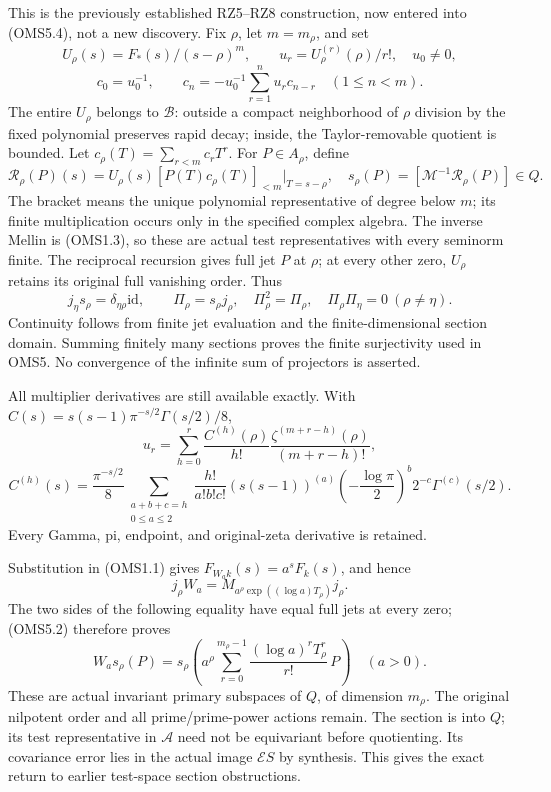 This is the previously established RZ5--RZ8 construction, now entered
into (OMS5.4), not a new discovery. Fix \(\rho\), let \(m=m_\rho\), and
set \[
U_\rho(s)=F_*(s)/(s-\rho)^m,\qquad
u_r=U_\rho^{(r)}(\rho)/r!,\quad u_0\ne0,
\] \[
c_0=u_0^{-1},\qquad
c_n=-u_0^{-1}\sum_{r=1}^n u_r c_{n-r}\quad(1\le n<m).
\tag{OMS6.1}
\] The entire \(U_\rho\) belongs to \(\mathcal B\): outside a compact
neighborhood of \(\rho\) division by the fixed polynomial preserves
rapid decay; inside, the Taylor-removable quotient is bounded. Let
\(c_\rho(T)=\sum_{r<m}c_rT^r\). For \(P\in A_\rho\), define \[
\mathcal R_\rho(P)(s)=U_\rho(s)
[P(T)c_\rho(T)]_{<m}\big|_{T=s-\rho},\quad
s_\rho(P)=[\mathcal M^{-1}\mathcal R_\rho(P)]\in Q.
\tag{OMS6.2}
\] The bracket means the unique polynomial representative of degree
below \(m\); its finite multiplication occurs only in the specified
complex algebra. The inverse Mellin is (OMS1.3), so these are actual
test representatives with every seminorm finite. The reciprocal
recursion gives full jet \(P\) at \(\rho\); at every other zero,
\(U_\rho\) retains its original full vanishing order. Thus \[
j_\eta s_\rho=\delta_{\eta\rho}\mathrm{id},\qquad
\Pi_\rho=s_\rho j_\rho,\quad
\Pi_\rho^2=\Pi_\rho,\quad\Pi_\rho\Pi_\eta=0\ (\rho\ne\eta).
\tag{OMS6.3}
\] Continuity follows from finite jet evaluation and the
finite-dimensional section domain. Summing finitely many sections proves
the finite surjectivity used in OMS5. No convergence of the infinite sum
of projectors is asserted.

All multiplier derivatives are still available exactly. With
\(C(s)=s(s-1)\pi^{-s/2}\Gamma(s/2)/8\), \[
u_r=\sum_{h=0}^r
\frac{C^{(h)}(\rho)}{h!}
\frac{\zeta^{(m+r-h)}(\rho)}{(m+r-h)!},
\] \[
C^{(h)}(s)=\frac{\pi^{-s/2}}8
\sum_{\substack{a+b+c=h\\0\le a\le2}}
\frac{h!}{a!b!c!}(s(s-1))^{(a)}
\left(-\frac{\log\pi}{2}\right)^b2^{-c}\Gamma^{(c)}(s/2).
\tag{OMS6.4}
\] Every Gamma, pi, endpoint, and original-zeta derivative is retained.

Substitution in (OMS1.1) gives \(F_{W_ak}(s)=a^sF_k(s)\), and hence \[
j_\rho W_a=
M_{a^\rho\exp((\log a)T_\rho)}j_\rho.
\] The two sides of the following equality have equal full jets at every
zero; (OMS5.2) therefore proves \[
\boxed{W_as_\rho(P)=
s_\rho\left(a^\rho\sum_{r=0}^{m_\rho-1}
\frac{(\log a)^rT_\rho^r}{r!}\,P\right)\quad(a>0).}
\tag{OMS6.5}
\] These are actual invariant primary subspaces of \(Q\), of dimension
\(m_\rho\). The original nilpotent order and all prime/prime-power
actions remain. The section is into \(Q\); its test representative in
\(\mathcal A\) need not be equivariant before quotienting. Its
covariance error lies in the actual image \(\mathcal ES\) by synthesis.
This gives the exact return to earlier test-space section obstructions.

